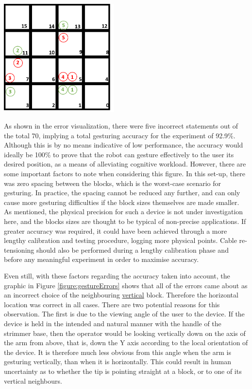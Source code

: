 \documentclass[11pt]{article}
\begin{document}
\begin{center}
\includegraphics[width=0.45\textwidth]{images/gestureErrors.png}
\label{figure:gestureErrors}
\end{center}

As shown in the error visualization, there were five incorrect statements out of the total 70, implying a total gesturing accuracy for the experiment of 92.9\%. Although this is by no means indicative of low performance, the accuracy would ideally be 100\% to prove that the robot can gesture effectively to the user its desired position, as a means of alleviating cognitive workload. However, there are some important factors to note when considering this figure. In this set-up, there was zero spacing between the blocks, which is the worst-case scenario for gesturing. In practice, the spacing cannot be reduced any further, and can only cause more gesturing difficulties if the block sizes themselves are made smaller. As mentioned, the physical precision for such a device is not under investigation here, and the blocks sizes are thought to be typical of non-precise applications. If greater accuracy was required, it could have been achieved through a more lengthy calibration and testing procedure, logging more physical points. Cable re-tensioning should also be performed during a lengthy calibration phase and before any meaningful experiment in order to maximise accuracy.

Even still, with these factors regarding the accuracy taken into account, the graphic in Figure \ref{figure:gestureErrors} shows that all of the errors came about as an incorrect choice of the neighbouring \underline{vertical} block. Therefore the horizontal location was correct in all cases. There are two potential reasons for this observation. The first is due to the viewing angle of the user to the device. If the device is held in the intended and natural manner with the handle of the strimmer base, then the operator would be looking vertically down on the axis of the arm from above, that is, down the Y axis according to the local orientation of the device. It is therefore much less obvious from this angle when the arm is gesturing vertically, than when it is horizontally. This could result in human uncertainty as to whether the tip is pointing straight at a block, or to one of its vertical neighbours. 
\end{document}
